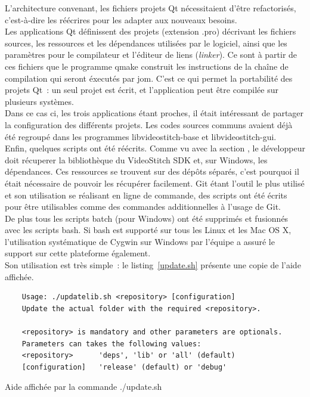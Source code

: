 \newline
L'architecture convenant, les fichiers projets Qt nécessitaient d'être refactorisés,
c'est-à-dire les réécrires pour les adapter aux nouveaux besoins.\\
Les applications Qt définissent des projets (extension .pro) décrivant
les fichiers sources, les ressources et les dépendances utilisées par le logiciel, ainsi que les
paramètres pour le compilateur et l'éditeur de liens (\textit{linker}). Ce sont à 
partir de ces fichiers que le programme qmake construit les instructions de la chaîne
de compilation qui seront éxecutés par jom\cite{qt}. C'est ce qui permet la portabilité
des projets Qt~: un seul projet est écrit, et l'application peut être compilée sur
plusieurs systèmes.\\
Dans ce cas ci, les trois applications étant proches, il était intéressant de partager
la configuration des différents projets. Les codes sources communs avaient déjà été
regroupé dans les programmes libvideostitch-base et libvideostitch-gui.
\ \\
\newline
Enfin, quelques scripts ont été réécrits. Comme vu avec la section , le
développeur doit récuperer la bibliothèque du VideoStitch SDK et, sur Windows,
les dépendances. Ces ressources se trouvent sur des dépôts séparés, c'est pourquoi
il était nécessaire de pouvoir les récupérer facilement. Git étant l'outil le plus
utilisé et son utilisation se réalisant en ligne de commande,
des scripts ont été écrits pour être utilisables comme des commandes additionnelles à l'usage de Git.\\
De plus tous les scripts batch (pour Windows) ont été supprimés et fusionnés avec
les scripts bash. Si bash est supporté sur tous les Linux et les Mac OS X,
l'utilisation systématique de Cygwin sur Windows par l'équipe a assuré le support
sur cette plateforme également.\\
Son utilisation est très simple~: le listing~\ref{update.sh} présente une copie de l'aide affichée.
\begin{listing}
  \begin{verbatim}
    Usage: ./updatelib.sh <repository> [configuration]
    Update the actual folder with the required <repository>.

    <repository> is mandatory and other parameters are optionals.
    Parameters can takes the following values:
    <repository>      'deps', 'lib' or 'all' (default)
    [configuration]   'release' (default) or 'debug'
  \end{verbatim}
  \caption{Aide affichée par la commande ./update.sh}
  \label{update.sh}
\end{listing}

